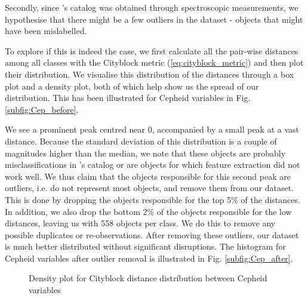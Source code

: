 \documentclass[conference]{IEEEtran}
\begin{document}
Secondly, since \cite{chenZwickyTransientFacility2020a}'s catalog was obtained through spectroscopic measurements, we hypothesise that there might be a few outliers in the dataset - objects that might have been mislabelled.

To explore if this is indeed the case, we first calculate all the pair-wise distances among all classes with the Cityblock metric (\ref{eq:cityblock_metric}) and then plot their distribution. We visualise this distribution of the distances through a box plot and a density plot, both of which help show us the spread of our distribution.  This has been illustrated for Cepheid variables in Fig. \ref{subfig:Cep_before}.

We see a prominent peak centred near 0, accompanied by a small peak at a vast distance. Because the standard deviation of this distribution is a couple of magnitudes higher than the median, we note that these objects are probably misclassifications in \cite{chenZwickyTransientFacility2020a}'s catalog or are objects for which feature extraction did not work well. We thus claim that the objects responsible for this second peak are outliers, i.e. do not represent most objects, and remove them from our dataset. This is done by dropping the objects responsible for the top 5\% of the distances. In addition, we also drop the bottom 2\% of the objects responsible for the low distances, leaving us with 558 objects per class. We do this to remove any possible duplicates or re-observations. After removing these outliers, our dataset is much better distributed without significant disruptions. The histogram for Cepheid variables after outlier removal is illustrated in Fig. \ref{subfig:Cep_after}.

\begin{figure}[ht]
    \centering
    \caption{Density plot for Cityblock distance distribution between Cepheid variables}
    \label{fig:outlier_removal}
\end{figure}
\end{document}
